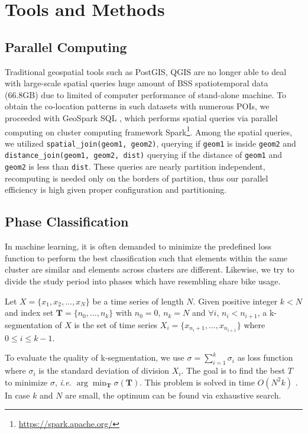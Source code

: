 \documentclass[preprints,ijgi,submit,moreauthors]{Definitions/mdpi}
\begin{document}
\section{Tools and Methods}

\subsection{Parallel Computing}
Traditional geospatial tools such as PostGIS, QGIS are no longer able to deal with large-scale spatial queries huge amount of BSS spatiotemporal data (66.8GB) due to limited of computer performance of stand-alone machine.
To obtain the co-location patterns in such datasets with numerous POIs, we proceeded with GeoSpark SQL \cite{huang2017geospark}, which performs spatial queries via parallel computing on cluster computing framework Spark\footnote{\url{https://spark.apache.org/}}.
Among the spatial queries, we utilized \texttt{spatial\_join(geom1, geom2)}, querying if \texttt{geom1} is inside \texttt{geom2} and \texttt{distance\_join(geom1, geom2, dist)} querying if the distance of \texttt{geom1} and \texttt{geom2} is less than \texttt{dist}.
These queries are nearly partition independent, recomputing is needed only on the borders of partition, thus our parallel efficiency is high given proper configuration and partitioning.

\subsection{Phase Classification}\label{sec:phase_classification}
In machine learning, it is often demanded to minimize the predefined loss function to perform the best classification such that elements within the same cluster are similar and elements across clusters are different.
Likewise, we try to divide the study period into phases which have resembling share bike usage.

\begin{Definition}[k-segmentation]\label{def:k-seg}
Let $X=\{x_1,x_2,\ldots,x_N\}$ be a time series of length $N$.
Given positive integer $k<N$ and index set $\mathbf{T}=\{n_0,\ldots,n_k\}$ with $n_0=0$, $n_k=N$ and $\forall i$, $n_i<n_{i+1}$, a k-segmentation of $X$ is the set of time series $X_i=\{x_{n_i+1},\ldots,x_{n_{i+1}}\}$ where $0\leq i\leq k-1$.
\end{Definition}

To evaluate the quality of k-segmentation, we use $\sigma=\sum_{i=1}^{k}{\sigma_i}$ as loss function where $\sigma_i$ is the standard deviation of division $X_i$. 
The goal is to find the best $T$ to minimize $\sigma$, \textit{i.e.} $\arg\min_{\mathbf{T}}\sigma(\mathbf{T})$.
This problem is solved in time $O(N^2k)$ \cite{terzi2006efficient}.
In case $k$ and $N$ are small, the optimum can be found via exhaustive search.
\end{document}
